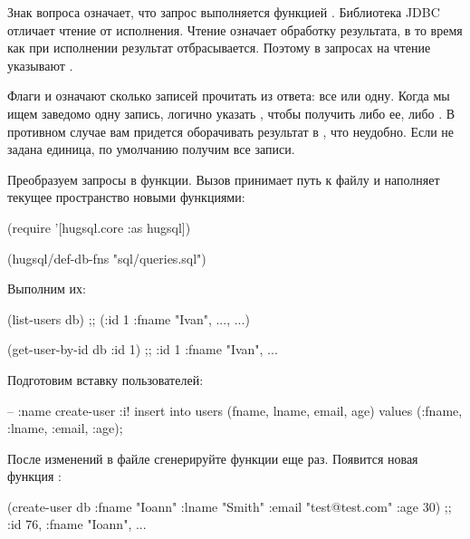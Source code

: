 Знак вопроса означает, что запрос выполняется функцией . Библиотека JDBC отличает чтение от исполнения. Чтение означает обработку результата, в то время как при исполнении результат отбрасывается. Поэтому в запросах на чтение указывают .

Флаги \code{:*} и  означают сколько записей прочитать из ответа: все или одну. Когда мы ищем заведомо одну запись, логично указать , чтобы получить либо ее, либо . В противном случае вам придется оборачивать результат в , что неудобно. Если не задана единица, по умолчанию получим все записи.

Преобразуем запросы в функции. Вызов  принимает путь к файлу и наполняет текущее пространство новыми функциями:

\begin{english}
  \begin{clojure}
(require '[hugsql.core :as hugsql])

(hugsql/def-db-fns "sql/queries.sql")
  \end{clojure}
\end{english}

Выполним их:

\begin{english}
  \begin{clojure}
(list-users db)
;; ({:id 1 :fname "Ivan", ...}, ...)

(get-user-by-id db {:id 1})
;; {:id 1 :fname "Ivan", ...}
  \end{clojure}
\end{english}

Подготовим вставку пользователей:

\begin{english}
  \begin{sql}
-- :name create-user :i!
insert into users (fname, lname, email, age)
values (:fname, :lname, :email, :age);
  \end{sql}
\end{english}

После изменений в файле сгенерируйте функции еще раз. Появится новая функция :

\begin{english}
  \begin{clojure}
(create-user db {:fname "Ioann"
                 :lname "Smith"
                 :email "test@test.com"
                 :age 30})
;; {:id 76, :fname "Ioann", ...}
  \end{clojure}
\end{english}

